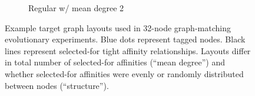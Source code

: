 \begin{figure}
\begin{center}
\begin{minipage}{0.95\textwidth}
\begin{minipage}{\textwidth}
\begin{minipage}{0.95\linewidth}
\begin{subfigure}[b]{0.5\textwidth}
\caption{
Regular w/ mean degree 2
}
\label{fig:regular_degree_2}
\label{fig:regular_2}
\end{subfigure}
\end{minipage}
\end{minipage}
\end{minipage}

\caption{
Example target graph layouts used in 32-node graph-matching evolutionary experiments.
Blue dots represent tagged nodes.
Black lines represent selected-for tight affinity relationships.
Layouts differ in total number of selected-for affinities (``mean degree'') and whether selected-for affinities were evenly or randomly distributed between nodes (``structure'').
}
\label{fig:graph_layouts}


\end{center}
\end{figure}
